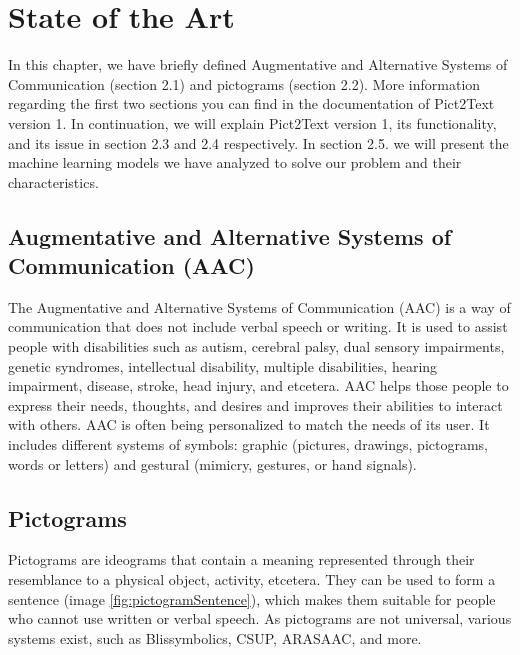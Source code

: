 
\chapter{State of the Art}
\label{State of the Art}

In this chapter, we have briefly defined Augmentative and Alternative Systems of Communication (section 2.1) and pictograms (section 2.2). More information regarding the first two sections you can find in the documentation of Pict2Text version 1.
In continuation, we will explain Pict2Text version 1, its functionality, and its issue in section 2.3 and 2.4 respectively. 
In section 2.5. we will present the machine learning models we have analyzed to solve our problem and their characteristics.


\section{Augmentative and Alternative Systems of Communication (AAC)}
The Augmentative and Alternative Systems of Communication (AAC) is a way of communication that does not include verbal speech or writing. It is used to assist people with disabilities such as autism, cerebral palsy, dual sensory impairments, genetic syndromes, intellectual disability, multiple disabilities, hearing impairment, disease, stroke, head injury, and etcetera. AAC helps those people to express their needs, thoughts, and desires and improves their abilities to interact with others. AAC is often being personalized to match the needs of its user. It includes different systems of symbols: graphic (pictures, drawings, pictograms, words or letters) and gestural (mimicry, gestures, or hand signals).

\section{Pictograms}
Pictograms are ideograms that contain a meaning represented through their resemblance to a physical object, activity, etcetera. They can be used to form a sentence (image \ref{fig:pictogramSentence}), which makes them suitable for people who cannot use written or verbal speech.
As pictograms are not universal, various systems exist, such as Blissymbolics, CSUP, ARASAAC, and more.

